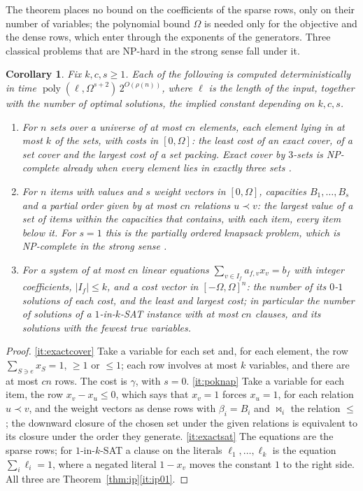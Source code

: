 \documentclass[11pt,reqno]{amsart}
\numberwithin{equation}{section}
\theoremstyle{plain}
\newtheorem{corollary}[theorem]{Corollary}
\theoremstyle{definition}
\theoremstyle{remark}
\DeclareMathOperator{\poly}{poly}
\newcommand{\rhon}{\rho}
\begin{document}
The theorem places no bound on the coefficients of the sparse rows, only on
their number of variables; the polynomial bound $\Omega$ is needed only for the
objective and the dense rows, which enter through the exponents of the
generators. Three classical problems that are NP-hard in the strong sense fall
under it.

\begin{corollary}\label{cor:ip}
Fix $k,c,s\ge1$. Each of the following is computed deterministically in time
$\poly(\ell,\Omega^{s+2})\,2^{O(\rhon(n))}$, where $\ell$ is the length of the
input, together with the number of optimal solutions, the implied constant
depending on $k,c,s$.
\begin{enumerate}[label=\textup{(\alph*)},leftmargin=2.2em]
\item\label{it:exactcover} For $n$ sets over a universe of at most $cn$
elements, each element lying in at most $k$ of the sets, with costs in
$[0,\Omega]$: the least cost of an exact cover, of a set cover and the largest
cost of a set packing. Exact cover by $3$-sets is NP-complete already when
every element lies in exactly three sets \cite{Gon85}.
\item\label{it:poknap} For $n$ items with values and $s$ weight vectors in
$[0,\Omega]$, capacities $B_1,\dots,B_s$ and a partial order given by at most
$cn$ relations $u\prec v$: the largest value of a set of items within the
capacities that contains, with each item, every item below it. For $s=1$ this
is the partially ordered knapsack problem, which is NP-complete in the strong
sense \cite{JN83}.
\item\label{it:exactsat} For a system of at most $cn$ linear equations
$\sum_{v\in I_f}a_{f,v}x_v=b_f$ with integer coefficients, $|I_f|\le k$, and a
cost vector in $[-\Omega,\Omega]^n$: the number of its $0$-$1$ solutions of
each cost, and the least and largest cost; in particular the number of
solutions of a $1$-in-$k$-SAT instance with at most $cn$ clauses, and its
solutions with the fewest true variables.
\end{enumerate}
\end{corollary}

\begin{proof}
\ref{it:exactcover} Take a variable for each set and, for each element, the
row $\sum_{S\ni e}x_S=1$, $\ge1$ or $\le1$; each row involves at most $k$
variables, and there are at most $cn$ rows. The cost is $\gamma$, with $s=0$.
\ref{it:poknap} Take a variable for each item, the row $x_v-x_u\le0$, which
says that $x_v=1$ forces $x_u=1$, for each relation $u\prec v$, and the weight
vectors as dense rows with $\beta_i=B_i$ and $\bowtie_i$ the relation $\le$;
the downward closure of the chosen set under the given relations is
equivalent to its closure under the order they generate. \ref{it:exactsat}
The equations are the sparse rows; for $1$-in-$k$-SAT a clause on the
literals $\ell_1,\dots,\ell_k$ is the equation $\sum_i\ell_i=1$, where a
negated literal $1-x_v$ moves the constant $1$ to the right side. All three
are Theorem~\ref{thm:ip}\ref{it:ip01}.
\end{proof}
\end{document}
